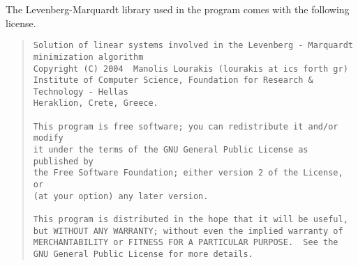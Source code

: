 \documentclass[a4paper,fleqn,11pt]{article}
\numberwithin{equation}{section}
\begin{document}
The Levenberg-Marquardt library used in the program comes with the following license.
\begin{quote}
\footnotesize
\begin{verbatim}
Solution of linear systems involved in the Levenberg - Marquardt
minimization algorithm
Copyright (C) 2004  Manolis Lourakis (lourakis at ics forth gr)
Institute of Computer Science, Foundation for Research & Technology - Hellas
Heraklion, Crete, Greece.

This program is free software; you can redistribute it and/or modify
it under the terms of the GNU General Public License as published by
the Free Software Foundation; either version 2 of the License, or
(at your option) any later version.

This program is distributed in the hope that it will be useful,
but WITHOUT ANY WARRANTY; without even the implied warranty of
MERCHANTABILITY or FITNESS FOR A PARTICULAR PURPOSE.  See the
GNU General Public License for more details.
\end{verbatim}
\end{quote}

%
%
\end{document}
